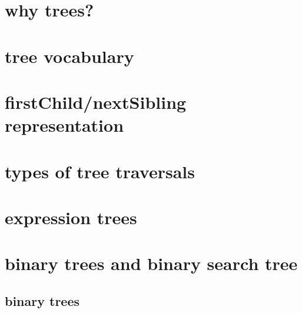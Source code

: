 \newcommand{\nred}[1]{{\color{red!60!black}\bfseries #1}}
\newcommand{\nblack}[1]{\textbf{#1}}


\begin{frame}
    \titlepage
\end{frame}



\section{why trees?}


\section{tree vocabulary}



\section{firstChild/nextSibling representation}


\section{types of tree traversals}


\section{expression trees}


\section{binary trees and binary search tree}
\subsection{binary trees}


